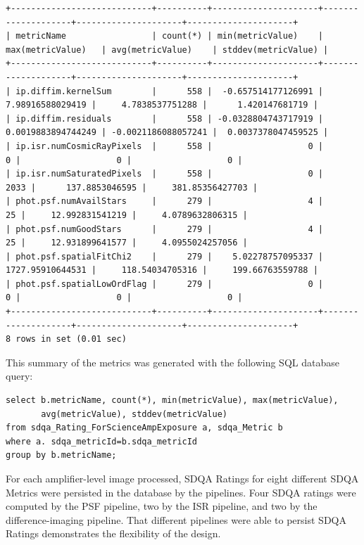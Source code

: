 {\tiny
\begin{verbatim}
+----------------------------+----------+---------------------+--------------------+---------------------+---------------------+
| metricName                 | count(*) | min(metricValue)    | max(metricValue)   | avg(metricValue)    | stddev(metricValue) |
+----------------------------+----------+---------------------+--------------------+---------------------+---------------------+
| ip.diffim.kernelSum        |      558 |  -0.657514177126991 |   7.98916588029419 |     4.7838537751288 |      1.420147681719 | 
| ip.diffim.residuals        |      558 | -0.0328804743717919 | 0.0019883894744249 | -0.0021186088057241 |  0.0037378047459525 | 
| ip.isr.numCosmicRayPixels  |      558 |                   0 |                  0 |                   0 |                   0 | 
| ip.isr.numSaturatedPixels  |      558 |                   0 |               2033 |      137.8853046595 |     381.85356427703 | 
| phot.psf.numAvailStars     |      279 |                   4 |                 25 |     12.992831541219 |     4.0789632806315 | 
| phot.psf.numGoodStars      |      279 |                   4 |                 25 |     12.931899641577 |     4.0955024257056 | 
| phot.psf.spatialFitChi2    |      279 |    5.02278757095337 |   1727.95910644531 |     118.54034705316 |     199.66763559788 | 
| phot.psf.spatialLowOrdFlag |      279 |                   0 |                  0 |                   0 |                   0 | 
+----------------------------+----------+---------------------+--------------------+---------------------+---------------------+
8 rows in set (0.01 sec)
\end{verbatim}
}

\noindent
This summary of the metrics was generated with the following SQL
database query:

{\small
\begin{verbatim}
select b.metricName, count(*), min(metricValue), max(metricValue),
       avg(metricValue), stddev(metricValue) 
from sdqa_Rating_ForScienceAmpExposure a, sdqa_Metric b 
where a. sdqa_metricId=b.sdqa_metricId 
group by b.metricName;
\end{verbatim}
}

For each amplifier-level image processed, SDQA Ratings for eight different SDQA Metrics 
were persisted in the database by the pipelines.  Four SDQA ratings were computed by
the PSF pipeline, two by the ISR pipeline, and two by the difference-imaging pipeline.
That different pipelines were able to persist SDQA Ratings demonstrates the flexibility of the design.

